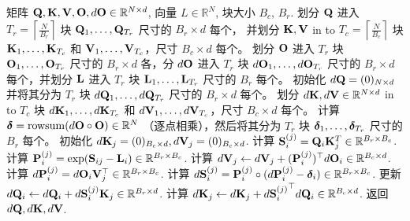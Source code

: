 \documentclass{article} %
\begin{document}
\begin{algorithm}[t]
  \caption{Flash Attention：反向过程}\label{alg:fa_backward}
  \begin{algorithmic}[1]
    \REQUIRE 矩阵 ${\mathbf{Q}}, {\mathbf{K}}, {\mathbf{V}}, {\mathbf{O}}, d{\mathbf{O}} \in \mathbb{R}^{N \times d}$,
    向量 $L \in \mathbb{R}^N$, 块大小 $B_c$, $B_r$.
    \STATE 划分 ${\mathbf{Q}}$ 进入 $T_r = \left\lceil\frac{N}{B_r} \right\rceil$ 块 ${\mathbf{Q}}_1, \dots, {\mathbf{Q}}_{T_r}$ 尺寸的 $B_r \times d$ 每个，
    并划分 ${\mathbf{K}}, {\mathbf{V}}$ in to $T_c = \left\lceil \frac{N}{B_c} \right\rceil$ 块 ${\mathbf{K}}_1, \dots, {\mathbf{K}}_{T_c}$ 和
    ${\mathbf{V}}_1, \dots, {\mathbf{V}}_{T_c}$，尺寸 $B_c \times d$ 每个。
    \STATE 划分 ${\mathbf{O}}$ 进入 $T_r$ 块 ${\mathbf{O}}_1, \dots, {\mathbf{O}}_{T_r}$ 尺寸的
    $B_r \times d$ 各，分 $d{\mathbf{O}}$ 进入 $T_r$ 块 $d{\mathbf{O}}_1, \dots, d{\mathbf{O}}_{T_r}$
    尺寸的 $B_r \times d$ 每个，并划分 ${\mathbf{L}}$ 进入 $T_r$ 块 ${\mathbf{L}}_1, \dots, {\mathbf{L}}_{T_r}$ 尺寸的
    $B_r$ 每个。
    \STATE 初始化 $d{\mathbf{Q}} = (0)_{N \times d}$ 并将其分为 $T_r$ 块 $d{\mathbf{Q}}_1, \dots, d{\mathbf{Q}}_{T_r}$ 尺寸的 $B_r \times d$ 每个。
    划分 $d{\mathbf{K}}, d{\mathbf{V}} \in \mathbb{R}^{N \times d}$ in to $T_c$ 块 $d{\mathbf{K}}_1, \dots, d{\mathbf{K}}_{T_c}$ 和
    $d{\mathbf{V}}_1, \dots, d{\mathbf{V}}_{T_c}$，尺寸 $B_c \times d$ 每个。
    \STATE 计算 ${\boldsymbol{\delta}} = \mathrm{rowsum}(d{\mathbf{O}} \circ {\mathbf{O}}) \in \mathbb{R}^N$ （逐点相乘），然后将其分为 $T_r$ 块 ${\boldsymbol{\delta}}_1, \dots, {\boldsymbol{\delta}}_{T_r}$ 尺寸的
    $B_r$ 每个。
      \STATE 初始化 $d{\mathbf{K}}_j = (0)_{B_c \times d}, d{\mathbf{V}}_j = (0)_{B_c \times d}$.
        \STATE 计算 ${\mathbf{S}}_{i}^{(j)} = {\mathbf{Q}}_i {\mathbf{K}}_j^T \in \mathbb{R}^{B_r \times B_c}$.
        \STATE 计算 ${\mathbf{P}}_{i}^{(j)} = \exp({\mathbf{S}}_{ij} - {\mathbf{L}}_{i}) \in \mathbb{R}^{B_r \times B_c}$.
        \STATE 计算
        $d{\mathbf{V}}_j \leftarrow d{\mathbf{V}}_j + ({\mathbf{P}}_{i}^{(j)})^\top d{\mathbf{O}}_i \in \mathbb{R}^{B_c \times d}$.
        \STATE 计算
        $d{\mathbf{P}}_{i}^{(j)} = d{\mathbf{O}}_{i} {\mathbf{V}}_j^\top \in \mathbb{R}^{B_r \times B_c}$.
        \STATE 计算 $d{\mathbf{S}}_{i}^{(j)} = {\mathbf{P}}_{i}^{(j)} \circ (d{\mathbf{P}}_{i}^{(j)} - {\boldsymbol{\delta}}_i) \in \mathbb{R}^{B_r \times B_c}$.
        \STATE 更新 $d{\mathbf{Q}}_{i} \leftarrow d{\mathbf{Q}}_i + d{\mathbf{S}}_{i}^{(j)} {\mathbf{K}}_j \in \mathbb{R}^{B_r \times d}$.
        \STATE 计算 $d{\mathbf{K}}_{j} \leftarrow d{\mathbf{K}}_j + {d{\mathbf{S}}_{i}^{(j)}}^\top d{\mathbf{Q}}_i \in \mathbb{R}^{B_c \times d}$.
      \ENDFOR
    \ENDFOR
    \STATE 返回 $d{\mathbf{Q}}, d{\mathbf{K}}, d{\mathbf{V}}$.
  \end{algorithmic}
\end{algorithm}
\end{document}
